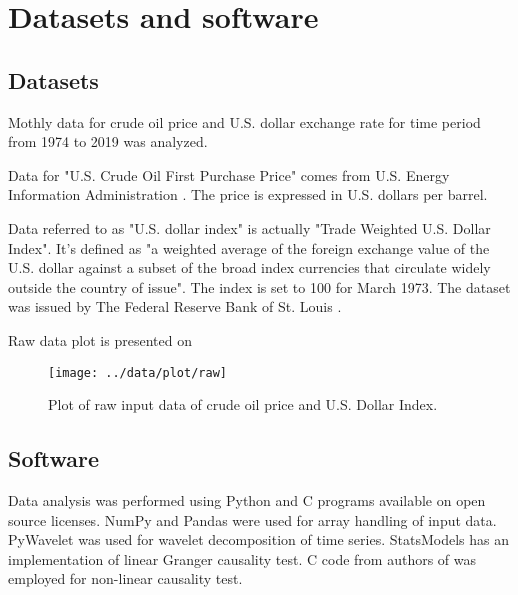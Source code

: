 \section{Datasets and software} \label{sec:data}

\subsection{Datasets}

Mothly data for crude oil price and U.S. dollar exchange rate for time period from 1974 to 2019 was analyzed.

Data for "U.S. Crude Oil First Purchase Price" comes from U.S. Energy Information Administration \cite{crude-oil-data}. The price is expressed in U.S. dollars per barrel.

Data referred to as "U.S. dollar index" is actually "Trade Weighted U.S. Dollar Index".
It's defined as "a weighted average of the foreign exchange value of the U.S. dollar against a subset of the broad index currencies that circulate widely outside the country of issue".
The index is set to 100 for March 1973.
The dataset was issued by The Federal Reserve Bank of St. Louis \cite{usd-data}.

Raw data plot is presented on 

\begin{figure}
	\texttt{[image: ../data/plot/raw]}
	\caption{Plot of raw input data of crude oil price and U.S. Dollar Index.}
	\label{fig:raw-data}
\end{figure}


\subsection{Software}
Data analysis was performed using Python and C programs available on open source licenses.
NumPy \cite{numpy} and Pandas \cite{reback2020pandas} were used for array handling of input data.
PyWavelet \cite{pywavelet} was used for wavelet decomposition of time series.
StatsModels \cite{statsmodels} has an implementation of linear Granger causality test.
C code from authors of \cite{diks-panchenko2004} was employed for non-linear causality test.
